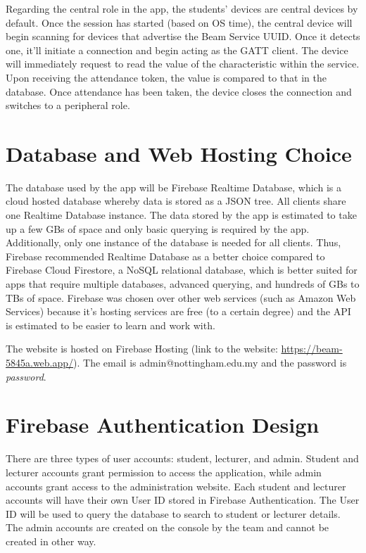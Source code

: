 \documentclass[../report.tex]{subfiles}
\begin{document}
Regarding the central role in the app, the students’ devices are central devices by default. Once the session has started (based on OS time), the central device will begin scanning for devices that advertise the Beam Service UUID. Once it detects one, it’ll initiate a connection and begin acting as the GATT client. The device will immediately request to read the value of the characteristic within the service. Upon receiving the attendance token, the value is compared to that in the database. Once attendance has been taken, the device closes the connection and switches to a peripheral role.

\section{Database and Web Hosting Choice}
The database used by the app will be Firebase Realtime Database, which is a cloud hosted database whereby data is stored as a JSON tree. All clients share one Realtime Database instance. The data stored by the app is estimated to take up a few GBs of space and only basic querying is required by the app. Additionally, only one instance of the database is needed for all clients. Thus, Firebase recommended Realtime Database as a better choice compared to Firebase Cloud Firestore, a NoSQL relational database, which is better suited for apps that require multiple databases, advanced querying, and hundreds of GBs to TBs of space. Firebase was chosen over other web services (such as Amazon Web Services) because it’s hosting services are free (to a certain degree) and the API is estimated to be easier to learn and work with.

The website is hosted on Firebase Hosting (link to the website: \url{https://beam-5845a.web.app/}). The email is admin@nottingham.edu.my and the password is \textit{password}.

\section{Firebase Authentication Design}
There are three types of user accounts: student, lecturer, and admin. Student and lecturer accounts grant permission to access the application, while admin accounts grant access to the administration website. Each student and lecturer accounts will have their own User ID stored in Firebase Authentication. The User ID will be used to query the database to search to student or lecturer details. The admin accounts are created on the console by the team and cannot be created in other way.
\end{document}

